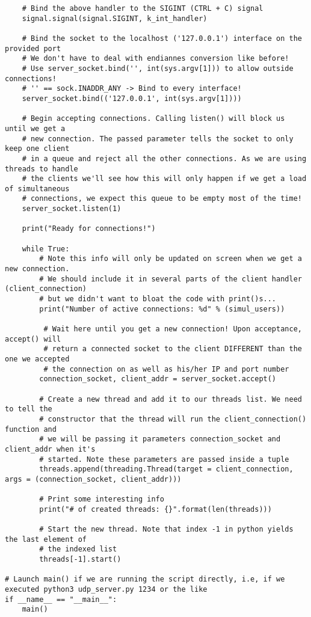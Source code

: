 \documentclass[landscape]{article}
\begin{document}
\begin{verbatim}
    # Bind the above handler to the SIGINT (CTRL + C) signal
    signal.signal(signal.SIGINT, k_int_handler)

    # Bind the socket to the localhost ('127.0.0.1') interface on the provided port
    # We don't have to deal with endiannes conversion like before!
    # Use server_socket.bind('', int(sys.argv[1])) to allow outside connections!
    # '' == sock.INADDR_ANY -> Bind to every interface!
    server_socket.bind(('127.0.0.1', int(sys.argv[1])))

    # Begin accepting connections. Calling listen() will block us until we get a
    # new connection. The passed parameter tells the socket to only keep one client
    # in a queue and reject all the other connections. As we are using threads to handle
    # the clients we'll see how this will only happen if we get a load of simultaneous
    # connections, we expect this queue to be empty most of the time!
    server_socket.listen(1)

    print("Ready for connections!")

    while True:
        # Note this info will only be updated on screen when we get a new connection.
        # We should include it in several parts of the client handler (client_connection)
        # but we didn't want to bloat the code with print()s...
        print("Number of active connections: %d" % (simul_users))

         # Wait here until you get a new connection! Upon acceptance, accept() will
         # return a connected socket to the client DIFFERENT than the one we accepted
         # the connection on as well as his/her IP and port number
        connection_socket, client_addr = server_socket.accept()

        # Create a new thread and add it to our threads list. We need to tell the
        # constructor that the thread will run the client_connection() function and
        # we will be passing it parameters connection_socket and client_addr when it's
        # started. Note these parameters are passed inside a tuple
        threads.append(threading.Thread(target = client_connection, args = (connection_socket, client_addr)))

        # Print some interesting info
        print("# of created threads: {}".format(len(threads)))

        # Start the new thread. Note that index -1 in python yields the last element of
        # the indexed list
        threads[-1].start()

# Launch main() if we are running the script directly, i.e, if we executed python3 udp_server.py 1234 or the like
if __name__ == "__main__":
    main()
                \end{verbatim}
\end{document}
